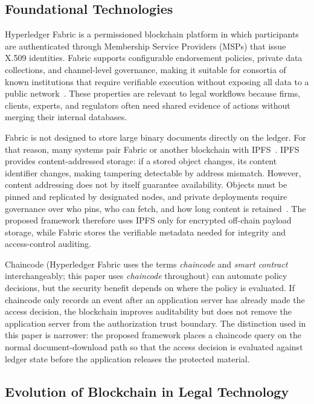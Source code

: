 \documentclass[preprint,12pt]{elsarticle}
\begin{document}
\subsection{Foundational Technologies}
\label{sec:foundations}

Hyperledger Fabric is a permissioned blockchain platform in which
participants are authenticated through Membership Service Providers
(MSPs) that issue X.509 identities. Fabric supports configurable
endorsement policies, private data collections, and channel-level
governance, making it suitable for consortia of known institutions
that require verifiable execution without exposing all data to a
public network~\cite{androulaki2018hyperledger,fabricMSP,
fabricPDCDoc,fabricEndorsementDoc}. These properties are relevant to
legal workflows because firms, clients, experts, and regulators often
need shared evidence of actions without merging their internal
databases.

Fabric is not designed to store large binary documents directly on the
ledger. For that reason, many systems pair Fabric or another
blockchain with IPFS~\cite{benet2014ipfs}. IPFS provides
content-addressed storage: if a stored object changes, its content
identifier changes, making tampering detectable by address mismatch.
However, content addressing does not by itself guarantee availability.
Objects must be pinned and replicated by designated nodes, and private
deployments require governance over who pins, who can fetch, and how
long content is retained~\cite{ipfsDocsQuickstartPin2025,
ipfsDocsKuboGarbageCollection}. The proposed framework therefore uses
IPFS only for encrypted off-chain payload storage, while Fabric stores
the verifiable metadata needed for integrity and access-control
auditing.

Chaincode (Hyperledger Fabric uses the terms \emph{chaincode}
and \emph{smart contract} interchangeably; this paper uses
\emph{chaincode} throughout) can automate policy decisions, but the security
benefit depends on where the policy is evaluated. If chaincode only
records an event after an application server has already made the
access decision, the blockchain improves auditability but does not
remove the application server from the authorization trust boundary.
The distinction used in this paper is narrower: the proposed framework
places a chaincode query on the normal document-download path so that
the access decision is evaluated against ledger state before the
application releases the protected material.

\subsection{Evolution of Blockchain in Legal Technology}
\label{sec:evolution}
\end{document}
